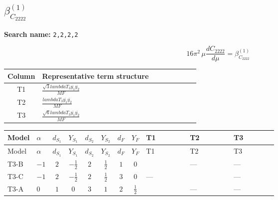 \documentclass[8pt]{article}
\begin{document}
\begin{landscape}
\section*{$\beta_{C_{2222}}^{(1)}$}
\noindent\textbf{Search name: }\texttt{2,2,2,2}\par\smallskip
\[16\pi^2\,\mu\frac{d C_{2222}}{d\mu}=\beta_{C_{2222}}^{(1)}\]
\begin{center}
\begin{tabular}{@{}c >{\raggedright\arraybackslash}p{0.82\linewidth}@{}}
\toprule
Column & Representative term structure \\
\midrule
T1 & \(\displaystyle \frac{\sqrt{3} lambdaT_{3} \overline{y_{1}} \overline{y_{2}}}{MF}\) \\
\midrule
T2 & \(\displaystyle \frac{lambdaT_{3} \overline{y_{1}} \overline{y_{2}}}{MF}\) \\
\midrule
T3 & \(\displaystyle \frac{\sqrt{6} lambdaT_{3} \overline{y_{1}} \overline{y_{2}}}{MF}\) \\
\midrule
\bottomrule
\end{tabular}
\end{center}
\smallskip
\tiny
\begin{longtable}{@{}llcccccc >{\raggedright\arraybackslash}p{0.21\linewidth} >{\raggedright\arraybackslash}p{0.21\linewidth} >{\raggedright\arraybackslash}p{0.21\linewidth}@{}}
\toprule
Model & $\alpha$ & $d_{S_1}$ & $Y_{S_1}$ & $d_{S_2}$ & $Y_{S_2}$ & $d_F$ & $Y_F$ & T1 & T2 & T3 \\
\midrule
\endfirsthead
\toprule
Model & $\alpha$ & $d_{S_1}$ & $Y_{S_1}$ & $d_{S_2}$ & $Y_{S_2}$ & $d_F$ & $Y_F$ & T1 & T2 & T3 \\
\midrule
\endhead
T3-B & $-1$ & $2$ & $-\frac{1}{2}$ & $2$ & $\frac{1}{2}$ & $1$ & $0$ & \scriptsize\adjustbox{max width=\linewidth}{$\begin{gathered} - \frac{2 \sqrt{3} lambdaT_{3} \overline{y_{1}} \overline{y_{2}}}{3 MF}\end{gathered}$} & --- & --- \\
\midrule
T3-C & $-1$ & $2$ & $-\frac{1}{2}$ & $2$ & $\frac{1}{2}$ & $3$ & $0$ & --- & \scriptsize\adjustbox{max width=\linewidth}{$\begin{gathered} \frac{2 lambdaT_{3} \overline{y_{1}} \overline{y_{2}}}{3 MF}\end{gathered}$} & --- \\
\midrule
T3-A & $0$ & $1$ & $0$ & $3$ & $1$ & $2$ & $\frac{1}{2}$ & \scriptsize\adjustbox{max width=\linewidth}{$\begin{gathered} - \frac{2 \sqrt{3} lambdaT_{3} \overline{y_{1}} \overline{y_{2}}}{3 MF}\end{gathered}$} & --- & --- \\

\end{longtable}
\end{landscape}
\end{document}

